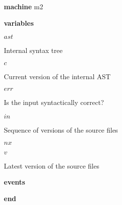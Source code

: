 \begin{block}
  \item   \textbf{machine} m2
  \item   \textbf{variables}
  \begin{block}
    \item   $ast$
    \item   \begin{block}
      \item    Internal syntax tree 
    \end{block}
    \item   $c$
    \item   \begin{block}
      \item   Current version of the internal AST
    \end{block}
    \item   $err$
    \item   \begin{block}
      \item    Is the input syntactically correct? 
    \end{block}
    \item   $in$
    \item   \begin{block}
      \item   Sequence of versions of the source files
    \end{block}
    \item   $nx$
    \item   $v$
    \item   \begin{block}
      \item   Latest version of the source files
    \end{block}
  \end{block}
  \item   \textbf{events}
  \begin{block}
    \item   
    \item   
    \item   
    \item   
  \end{block}
  \item   \textbf{end} \\
\end{block}
